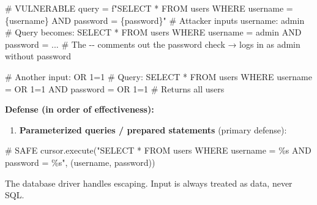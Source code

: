 \documentclass[11pt]{article}
\providecommand{\tightlist}{\setlength{\itemsep}{1pt}\setlength{\parskip}{0pt}}
\newenvironment{Shaded}{\begin{snugshade}}{\end{snugshade}}
\newcommand{\CommentTok}[1]{\textcolor[rgb]{0.48,0.49,0.49}{#1}}
\newcommand{\NormalTok}[1]{\textcolor[rgb]{0.81,0.81,0.76}{#1}}
\newcommand{\OperatorTok}[1]{\textcolor[rgb]{0.81,0.81,0.76}{#1}}
\newcommand{\SpecialCharTok}[1]{\textcolor[rgb]{0.24,0.68,0.91}{#1}}
\newcommand{\SpecialStringTok}[1]{\textcolor[rgb]{0.85,0.27,0.33}{#1}}
\newcommand{\StringTok}[1]{\textcolor[rgb]{0.96,0.31,0.31}{#1}}
\begin{document}
\begin{Shaded}
\begin{Highlighting}[]
\CommentTok{\# VULNERABLE}
\NormalTok{query }\OperatorTok{=} \SpecialStringTok{f"SELECT * FROM users WHERE username = \textquotesingle{}}\SpecialCharTok{\{}\NormalTok{username}\SpecialCharTok{\}}\SpecialStringTok{\textquotesingle{} AND password = \textquotesingle{}}\SpecialCharTok{\{}\NormalTok{password}\SpecialCharTok{\}}\SpecialStringTok{\textquotesingle{}"}
\CommentTok{\# Attacker inputs username: admin\textquotesingle{}{-}{-}}
\CommentTok{\# Query becomes: SELECT * FROM users WHERE username = \textquotesingle{}admin\textquotesingle{}{-}{-}\textquotesingle{} AND password = \textquotesingle{}...\textquotesingle{}}
\CommentTok{\# The {-}{-} comments out the password check → logs in as admin without password}

\CommentTok{\# Another input: \textquotesingle{} OR \textquotesingle{}1\textquotesingle{}=\textquotesingle{}1}
\CommentTok{\# Query: SELECT * FROM users WHERE username = \textquotesingle{}\textquotesingle{} OR \textquotesingle{}1\textquotesingle{}=\textquotesingle{}1\textquotesingle{} AND password = \textquotesingle{}\textquotesingle{} OR \textquotesingle{}1\textquotesingle{}=\textquotesingle{}1\textquotesingle{}}
\CommentTok{\# Returns all users}
\end{Highlighting}
\end{Shaded}

\textbf{Defense (in order of effectiveness):}

\begin{enumerate}
\def\labelenumi{\arabic{enumi}.}
\tightlist
\item
  \textbf{Parameterized queries / prepared statements} (primary defense):
\end{enumerate}


\begin{Shaded}
\begin{Highlighting}[]
\CommentTok{\# SAFE}
\NormalTok{cursor.execute(}\StringTok{"SELECT * FROM users WHERE username = }\SpecialCharTok{\%s}\StringTok{ AND password = }\SpecialCharTok{\%s}\StringTok{"}\NormalTok{, (username, password))}
\end{Highlighting}
\end{Shaded}

The database driver handles escaping. Input is always treated as data, never SQL.
\end{document}
